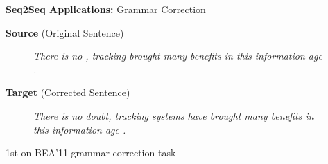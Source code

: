 \documentclass{beamer}
\let\tempone\itemize
\let\temptwo\enditemize
\renewenvironment{itemize}{\tempone\addtolength{\itemsep}{0.5\baselineskip}}{\temptwo}
\newcommand{\air}{\vspace{0.25cm}}
\newcommand{\mair}{\vspace{-0.25cm}}
\newcommand{\Cite}[1]{{\footnotesize \citep{#1}}}
\begin{document}
\begin{frame}
  \centerline{\textbf{Seq2Seq Applications:} \alert{Grammar Correction} \Cite{Schmaltz2016} }
  
  \begin{center}
    \textbf{Source} (Original Sentence)
  \end{center}
  
  \begin{figure}
    \textit{There is no , tracking  brought many benefits in this information
age . }
  \end{figure}

  \begin{center}
    \textbf{Target} (Corrected Sentence)
  \end{center}
  \mair

  \begin{figure}
    \centering
    \textit{There is no doubt, tracking systems have
      brought many benefits in this information
      age . }
  \end{figure}

  \begin{itemize}
  \item 1st on BEA'11 grammar correction task \Cite{Daudaravicius2016}
  \end{itemize}
\end{frame}


\end{document}
